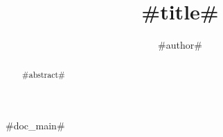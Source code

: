 \documentclass[times]{article}
\begin{document}
\title{#title#}
\author{#author#}

\begin{abstract}
#abstract#
\end{abstract}

\maketitle

#doc_main#
\end{document}
